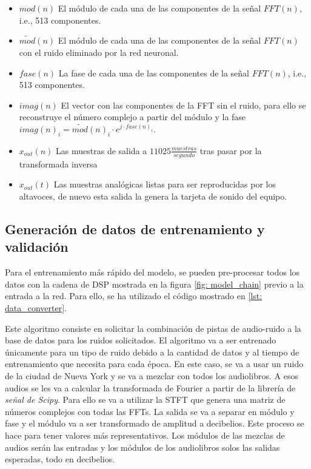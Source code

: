 \begin{itemize}
\begin{center}
 	\end{center}
 	\item $mod(n)$ El módulo de cada una de las componentes de la señal $FFT(n)$, i.e., 513 componentes.
 	\item $\widetilde{mod}(n)$ El módulo de cada una de las componentes de la señal $FFT(n)$ con el ruido eliminado por la red neuronal.
 	\item $fase(n)$ La fase de cada una de las componentes de la señal $FFT(n)$, i.e., 513 componentes.
 	\item $imag(n)$ El vector con las componentes de la \gls{FFT} sin el ruido, para ello se reconstruye el número complejo a partir del módulo y la fase $imag(n)_i = \widetilde{mod}(n)_i\cdot e^{j\cdot fase(n)_i}$.
 	\item $x_{out}(n)$ Las muestras de salida a $11025\frac{muestras}{segundo}$ tras pasar por la transformada inversa
 	\item $x_{out}(t)$ Las muestras analógicas listas para ser reproducidas por los altavoces, de nuevo esta salida la genera la tarjeta de sonido del equipo.
\end{itemize}

\subsection{Generación de datos de entrenamiento y validación}
Para el entrenamiento más rápido del modelo, se pueden pre-procesar todos los datos con la cadena de \gls{DSP} mostrada en la figura \ref{fig: model_chain} previo a la entrada a la red. Para ello, se ha utilizado el código mostrado en \ref{lst: data_converter}.

Este algoritmo consiste en solicitar la combinación de pistas de audio-ruido a la base de datos para los ruidos solicitados. El algoritmo va a ser entrenado únicamente para un tipo de ruido debido a la cantidad de datos y al tiempo de entrenamiento que necesita para cada época. En este caso, se va a usar un ruido de la ciudad de Nueva York y se va a mezclar con todos los audiolibros. A esos audios se les va a calcular la transformada de Fourier a partir de la librería de \textit{señal de Scipy}. Para ello se va a utilizar la \gls{STFT} que genera una matriz de números complejos con todas las \glspl{FFT}. La salida se va a separar en módulo y fase y el módulo va a ser transformado de amplitud a decibelios. Este proceso se hace para tener valores más representativos. Los módulos de las mezclas de audios serán las entradas y los módulos de los audiolibros solos las salidas esperadas, todo en decibelios.

